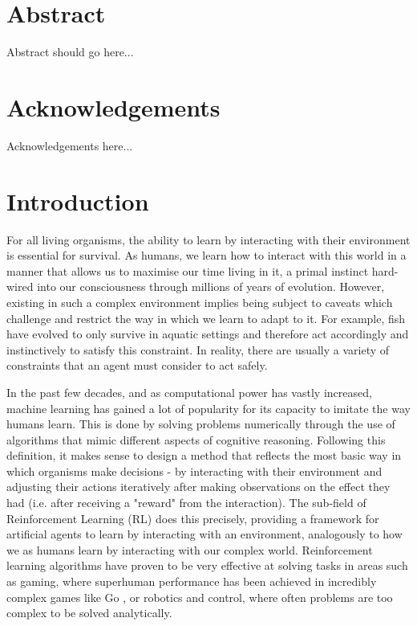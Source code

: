 \documentclass[12pt,twoside]{report}
\date{June 2022}
\begin{document}



\clearpage{\pagestyle{empty}\cleardoublepage}
\setcounter{page}{1}
\pagestyle{fancy}

\tableofcontents 

\setcounter{page}{1}
\fancyhead[LE,RO]{\slshape \rightmark}
\fancyhead[LO,RE]{\slshape \leftmark}

\chapter*{Abstract}
Abstract should go here...

\chapter*{Acknowledgements}
Acknowledgements here...

\chapter{Introduction}

For all living organisms, the ability to learn by interacting with their environment is essential for survival. As humans, we learn how to interact with this world in a manner that allows us to maximise our time living in it, a primal instinct hard-wired into our consciousness through millions of years of evolution. However, existing in such a complex environment implies being subject to caveats which challenge and restrict the way in which we learn to adapt to it. For example, fish have evolved to only survive in aquatic settings and therefore act accordingly and instinctively to satisfy this constraint. In reality, there are usually a variety of constraints that an agent must consider to act safely. 

\smallskip

In the past few decades, and as computational power has vastly increased, machine learning has gained a lot of popularity for its capacity to imitate the way humans learn. This is done by solving problems numerically through the use of algorithms that mimic different aspects of cognitive reasoning. Following this definition, it makes sense to design a method that reflects the most basic way in which organisms make decisions - by interacting with their environment and adjusting their actions iteratively after making observations on the effect they had (i.e. after receiving a "reward" from the interaction). The sub-field of Reinforcement Learning (RL) \cite{Sutton1998} does this precisely, providing a framework for artificial agents to learn by interacting with an environment, analogously to how we as humans learn by interacting with our complex world. Reinforcement learning algorithms have proven to be very effective at solving tasks in areas such as gaming, where superhuman performance has been achieved in incredibly complex games like Go \cite{SilverHuangEtAl16nature}, or robotics and control, where often problems are too complex to be solved analytically.
\end{document}
